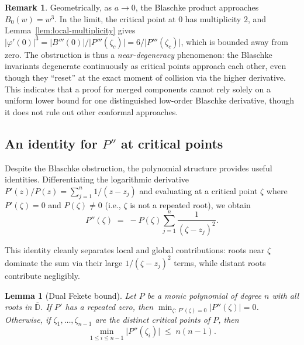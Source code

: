 \documentclass[11pt,a4paper]{amsart}
\newtheorem{lemma}[theorem]{Lemma}
\theoremstyle{definition}
\newtheorem{remark}[theorem]{Remark}
\newcommand{\D}{\mathbb{D}}
\newcommand{\abs}[1]{\lvert #1 \rvert}
\begin{document}
\begin{remark}
Geometrically, as $a \to 0$, the Blaschke product approaches
$B_0(w) = w^3$.  In the limit, the critical point at $0$ has
multiplicity $2$, and Lemma~\ref{lem:local-multiplicity}
gives $\abs{\varphi'(0)}^3 = \abs{B'''(0)}/\abs{P'''(\zeta_c)} = 6/\abs{P'''(\zeta_c)}$,
which is bounded away from zero.  The obstruction is thus a
\emph{near-degeneracy} phenomenon: the Blaschke invariants degenerate
continuously as critical points approach each other, even though they
``reset'' at the exact moment of collision via the higher derivative.
This indicates that a proof for merged components cannot rely solely
on a uniform lower bound for one distinguished low-order Blaschke
derivative, though it does not rule out other conformal approaches.
\end{remark}

\subsection{An identity for $P''$ at critical points}

Despite the Blaschke obstruction, the polynomial structure provides
useful identities.  Differentiating the logarithmic derivative
$P'(z)/P(z) = \sum_{j=1}^n 1/(z-z_j)$ and evaluating at a critical
point $\zeta$ where $P'(\zeta) = 0$ and $P(\zeta) \neq 0$
(i.e., $\zeta$ is not a repeated root), we obtain
\begin{equation}\label{eq:Ppp-identity}
  P''(\zeta) \;=\; -P(\zeta) \sum_{j=1}^n \frac{1}{(\zeta - z_j)^2}.
\end{equation}

This identity cleanly separates local and global contributions:
roots near $\zeta$ dominate the sum via their large $1/(\zeta-z_j)^2$
terms, while distant roots contribute negligibly.

\begin{lemma}[Dual Fekete bound]\label{lem:dual-fekete}
Let $P$ be a monic polynomial of degree $n$ with all roots in
$\overline{\D}$.  If $P'$ has a repeated zero, then
$\min_{\zeta:\,P'(\zeta)=0}\abs{P''(\zeta)} = 0$.
Otherwise, if $\zeta_1, \ldots, \zeta_{n-1}$ are the distinct
critical points of $P$, then
\begin{equation}\label{eq:dual-fekete}
  \min_{1 \leq i \leq n-1} \abs{P''(\zeta_i)} \;\leq\; n(n-1).
\end{equation}
\end{lemma}
\end{document}
